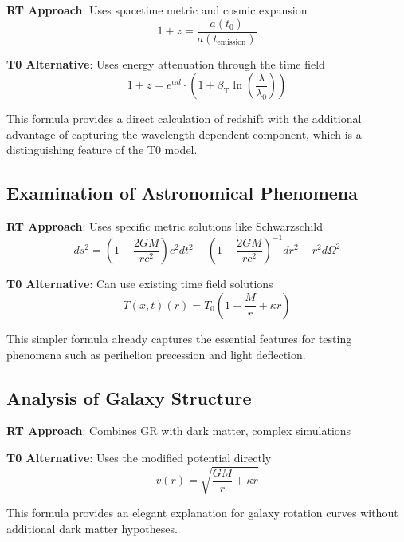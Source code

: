 \documentclass[12pt,a4paper]{article}
\newcommand{\Tfieldt}{T(x,t)}
\newcommand{\betaT}{\beta_{\text{T}}}
\newcommand{\Tzero}{T_0}
\begin{document}
	\textbf{RT Approach}: Uses spacetime metric and cosmic expansion
	\begin{equation}
		1+z = \frac{a(t_0)}{a(t_{\text{emission}})}
	\end{equation}
	
	\textbf{T0 Alternative}: Uses energy attenuation through the time field
	\begin{equation}
		1+z = e^{\alpha d} \cdot \left(1 + \betaT \ln\left(\frac{\lambda}{\lambda_0}\right)\right)
	\end{equation}
	
	This formula provides a direct calculation of redshift with the additional advantage of capturing the wavelength-dependent component, which is a distinguishing feature of the T0 model.
	
	\subsection{Examination of Astronomical Phenomena}
	\label{subsec:astronomical_phenomena}
	
	\textbf{RT Approach}: Uses specific metric solutions like Schwarzschild
	\begin{equation}
		ds^2 = \left(1-\frac{2GM}{rc^2}\right)c^2dt^2 - \left(1-\frac{2GM}{rc^2}\right)^{-1}dr^2 - r^2d\Omega^2
	\end{equation}
	
	\textbf{T0 Alternative}: Can use existing time field solutions
	\begin{equation}
		\Tfieldt(r) = \Tzero\left(1 - \frac{M}{r} + \kappa r\right)
	\end{equation}
	
	This simpler formula already captures the essential features for testing phenomena such as perihelion precession and light deflection.
	
	\subsection{Analysis of Galaxy Structure}
	\label{subsec:galactic_structure}
	
	\textbf{RT Approach}: Combines GR with dark matter, complex simulations
	
	\textbf{T0 Alternative}: Uses the modified potential directly
	\begin{equation}
		v(r) = \sqrt{\frac{GM}{r} + \kappa r}
	\end{equation}
	
	This formula provides an elegant explanation for galaxy rotation curves without additional dark matter hypotheses.
	
\end{document}
